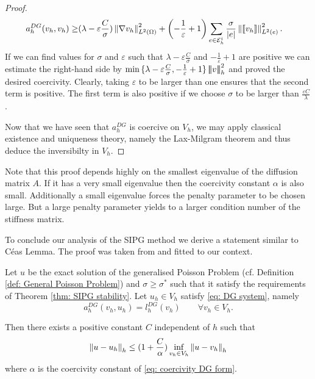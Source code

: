 \begin{proof}
	\begin{align*}
	a_h^{DG}(v_h,v_h)  \geq& (\lambda- \varepsilon \frac C \sigma)
	\left\lVert \nabla v_h \right\rVert_{L^2(\Omega)}^2
	+ \left(-\frac 1 \varepsilon +1\right) \sum_{e\in \mathcal{E}_h^i}  \frac \sigma {|e|} \left\lVert \llbracket v_h \rrbracket \right\rVert_{L^2(e)}^2.
	\end{align*}
	If we can find values for $\sigma$ and $\varepsilon$ such that $\lambda-\varepsilon \frac C \sigma$ and $-\frac 1 \varepsilon +1$ are positive we can estimate the right-hand side by $\min{\{\lambda-\varepsilon \frac C \sigma,-\frac 1 \varepsilon +1\}} \left| \! \left| \! \left| v \right| \! \right| \! \right|_{h}^2$ and proved the desired coercivity. 
	Clearly, taking $\varepsilon$ to be larger than one ensures that the second term is positive. The first term is also positive if we choose $\sigma$ to be larger than $\frac {\varepsilon C} \lambda$.
	
	Now that we have seen that $a_h^{DG}$ is coercive on $V_h$, we may apply classical existence and uniqueness theory, namely the Lax-Milgram theorem and thus deduce the inversibilty in $V_h$.
\end{proof}
Note that this proof depends highly on the smallest eigenvalue of the diffusion matrix $A$. If it has a very small eigenvalue then the coercivity constant $\alpha$ is also small.
Additionally a small eigenvalue forces the penalty parameter to be chosen large. But a large penalty parameter yields to a larger condition number of the stiffness matrix.

To conclude our analysis of the SIPG method we derive a statement similar to C\'eas Lemma. The proof was taken from \cite[Lemma 10.5.2]{BS2002} and fitted to our context.
\begin{theorem}\label{thm: error estimate}
	Let $u$ be the exact solution of the generalised Poisson Problem (cf. Definition \ref{def: General Poisson Problem}) and $\sigma \geq \sigma^*$ such that it satisfy the requirements of Theorem \ref{thm: SIPG stability}. Let $u_h \in V_h$ satisfy \eqref{eq: DG system}, namely
	\[
	a_h^{DG}(v_h, u_h) = l^{DG}_h(v_h) \qquad \forall v_h \in V_h.
	\]
\end{theorem}
Then there exists a positive constant $C$ independent of $h$ such that 
\[
\left\lVert u - u_h  \right\rVert_{h} \leq (1+\frac C \alpha) \inf_{v_h \in V_h} \left\lVert u - v_h \right\rVert_{h}
\]
where $\alpha$ is the coercivity constant of \eqref{eq: coercivity DG form}. %

